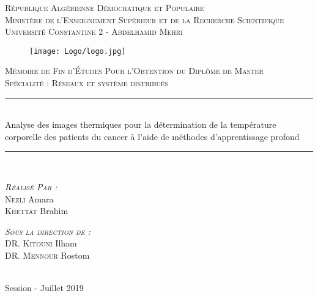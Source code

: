 \documentclass[12pt]{article}
\newcommand{\HRule}{\rule{\linewidth}{0.5mm}}
\begin{document}
\begin{titlepage}
	\begin{sffamily}
		\begin{center}
		\textsc{République Algérienne Démocratique et Populaire\\Ministère de l'Enseignement Supérieur et de la Recherche Scientifique\\Université Constantine 2 - Abdelhamid Mehri}\\[0.5 cm]			\begin{figure}[h]
			\centering
			\texttt{[image: Logo/logo.jpg]}
		\end{figure}
		
\textsc{Mémoire de Fin d’Études Pour l’Obtention du Diplôme de Master}\\

\textsc{Spécialité : Réseaux et système distribués}\\[1 cm]
		 \HRule \\[0.2cm]
    { \huge  Analyse des images thermiques pour la détermination de la température corporelle des patients du cancer à l'aide de méthodes d'apprentissage profond \\[0.2cm] }
    \HRule \\[1cm]
    
    
        \begin{minipage}{0.4\textwidth}
      \begin{flushleft} \large
      	\emph{\textsc{Réalisé Par :}}\\
		\textsc{Nezli} Amara\\
        \textsc{Khettat} Brahim\\
      \end{flushleft}
    \end{minipage}
    \begin{minipage}{0.4\textwidth}
      \begin{flushright} \large
        \emph{\textsc{Sous la direction de :}}\\ \textsc{DR}. \textsc{Kitouni} Ilham\\
        												\textsc{DR}. \textsc{Mennour} Rostom
      \end{flushright}
    \end{minipage}
\vfill

	\\[1 cm]
    {\large Session - Juillet 2019}
		\end{center}
	\end{sffamily}
\end{titlepage}
\end{document}
